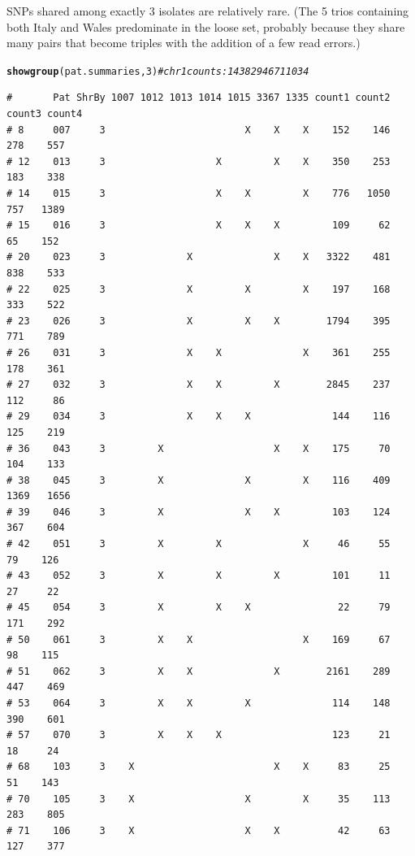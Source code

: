 \documentclass{article}\usepackage[]{graphicx}\usepackage[]{color}
\makeatletter
\newcommand{\hlnum}[1]{\textcolor[rgb]{0.686,0.059,0.569}{#1}}%
\newcommand{\hlcom}[1]{\textcolor[rgb]{0.678,0.584,0.686}{\textit{#1}}}%
\newcommand{\hlstd}[1]{\textcolor[rgb]{0.345,0.345,0.345}{#1}}%
\newcommand{\hlkwd}[1]{\textcolor[rgb]{0.737,0.353,0.396}{\textbf{#1}}}%
\newenvironment{kframe}{%
 \def\at@end@of@kframe{}%
 \ifinner\ifhmode%
  \def\at@end@of@kframe{\end{minipage}}%
  \begin{minipage}{\columnwidth}%
 \fi\fi%
 \def\FrameCommand##1{\hskip\@totalleftmargin \hskip-\fboxsep
 \colorbox{shadecolor}{##1}\hskip-\fboxsep
     \hskip-\linewidth \hskip-\@totalleftmargin \hskip\columnwidth}%
 \MakeFramed {\advance\hsize-\width
   \@totalleftmargin\z@ \linewidth\hsize
   \@setminipage}}%
 {\par\unskip\endMakeFramed%
 \at@end@of@kframe}
\newenvironment{knitrout}{}{} %
\makeatother
\begin{document}
SNPs shared among exactly 3 isolates are relatively rare.  (The 5 trios containing both Italy and Wales predominate in
the loose set, probably because they share many pairs that become triples with the addition of a few read errors.)

\begin{knitrout}\footnotesize
{}\color{fgcolor}\begin{kframe}
\begin{alltt}
\hlkwd{showgroup}\hlstd{(pat.summaries,}\hlnum{3}\hlstd{)} \hlcom{# chr 1 counts: 1438    294    671  1034}
\end{alltt}
\begin{verbatim}
#       Pat ShrBy 1007 1012 1013 1014 1015 3367 1335 count1 count2 count3 count4
# 8     007     3                        X    X    X    152    146    278    557
# 12    013     3                   X         X    X    350    253    183    338
# 14    015     3                   X    X         X    776   1050    757   1389
# 15    016     3                   X    X    X         109     62     65    152
# 20    023     3              X              X    X   3322    481    838    533
# 22    025     3              X         X         X    197    168    333    522
# 23    026     3              X         X    X        1794    395    771    789
# 26    031     3              X    X              X    361    255    178    361
# 27    032     3              X    X         X        2845    237    112     86
# 29    034     3              X    X    X              144    116    125    219
# 36    043     3         X                   X    X    175     70    104    133
# 38    045     3         X              X         X    116    409   1369   1656
# 39    046     3         X              X    X         103    124    367    604
# 42    051     3         X         X              X     46     55     79    126
# 43    052     3         X         X         X         101     11     27     22
# 45    054     3         X         X    X               22     79    171    292
# 50    061     3         X    X                   X    169     67     98    115
# 51    062     3         X    X              X        2161    289    447    469
# 53    064     3         X    X         X              114    148    390    601
# 57    070     3         X    X    X                   123     21     18     24
# 68    103     3    X                        X    X     83     25     51    143
# 70    105     3    X                   X         X     35    113    283    805
# 71    106     3    X                   X    X          42     63    127    377

\end{verbatim}
\end{kframe}
\end{knitrout}
\end{document}
